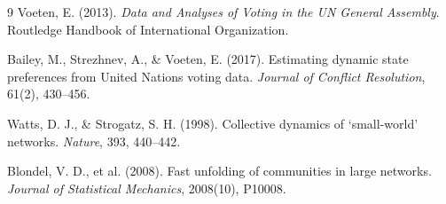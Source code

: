 \documentclass[12pt,a4paper]{article}
\begin{document}

\begin{thebibliography}{9}
 Voeten, E. (2013).
  \textit{Data and Analyses of Voting in the UN General Assembly}.
  Routledge Handbook of International Organization.

 Bailey, M., Strezhnev, A., \& Voeten, E. (2017).
  Estimating dynamic state preferences from United Nations voting data.
  \textit{Journal of Conflict Resolution}, 61(2), 430--456.

 Watts, D. J., \& Strogatz, S. H. (1998).
  Collective dynamics of `small-world' networks.
  \textit{Nature}, 393, 440--442.

 Blondel, V. D., et al. (2008).
  Fast unfolding of communities in large networks.
  \textit{Journal of Statistical Mechanics}, 2008(10), P10008.
\end{thebibliography}
\end{document}
